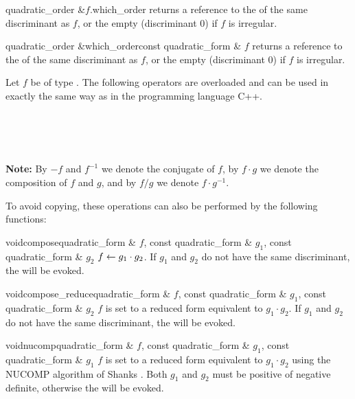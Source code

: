 \begin{cfcode}{quadratic_order &}{$f$.which_order}{}
  returns a reference to the  of the same discriminant as $f$, or the
  empty  (discriminant $0$) if $f$ is irregular.
\end{cfcode}

\begin{fcode}{quadratic_order &}{which_order}{const quadratic_form & $f$}
  returns a reference to the  of the same discriminant as $f$, or the
  empty  (discriminant $0$) if $f$ is irregular.
\end{fcode}



\ARTH

Let $f$ be of type .  The following operators are overloaded and can be
used in exactly the same way as in the programming language C++.
\begin{center}
  \\
  \\
  \\
\end{center}
\textbf{Note:} By $-f$ and $f^{-1}$ we denote the conjugate of $f$, by $f \cdot g$ we denote the
composition of $f$ and $g$, and by $f / g$ we denote $f \cdot g^{-1}$.

To avoid copying, these operations can also be performed by the following functions:

\begin{fcode}{void}{compose}{quadratic_form & $f$, const quadratic_form & $g_1$,
    const quadratic_form & $g_2$}%
  $f \leftarrow g_1 \cdot g_2$.  If $g_1$ and $g_2$ do not have the same discriminant, the \LEH
  will be evoked.
\end{fcode}

\begin{fcode}{void}{compose_reduce}{quadratic_form & $f$, const quadratic_form & $g_1$,
    const quadratic_form & $g_2$}%
  $f$ is set to a reduced form equivalent to $g_1 \cdot g_2$.  If $g_1$ and $g_2$ do not have
  the same discriminant, the \LEH will be evoked.
\end{fcode}

\begin{fcode}{void}{nucomp}{quadratic_form & $f$, const quadratic_form & $g_1$,
    const quadratic_form & $g_1$}%
  $f$ is set to a reduced form equivalent to $g_1 \cdot g_2$ using the NUCOMP algorithm of
  Shanks \cite{Cohen:1995}.  Both $g_1$ and $g_2$ must be positive of negative definite,
  otherwise the \LEH will be evoked.
\end{fcode}

